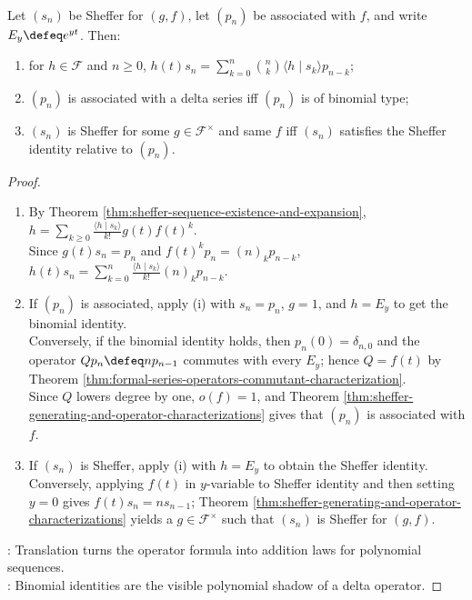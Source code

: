 \begin{theorem} \label{thm:sheffer-action-and-binomial-identities} \\
Let $(s_n)$ be Sheffer for $(g,f)$, let $(p_n)$ be associated with $f$, and
        write $E_y\defeq e^{yt}$. Then:
\begin{enumerate}[label=(\roman*)]
\setlength{\itemsep}{0pt}
\item for $h\in\mathscr{F}$ and $n\geq0$, $h(t)s_n=\sum\limits_{k=0}^{n}\binom{n}{k} \langle h\mid s_k\rangle p_{n-k}$;
\item $(p_n)$ is associated with a delta series iff $(p_n)$ is of binomial type;
\item $(s_n)$ is Sheffer for some $g\in\mathscr{F}^{\times}$ and same $f$ iff $(s_n)$ satisfies the Sheffer identity relative to $(p_n)$.
\end{enumerate}
\begin{proof}
\begin{enumerate}[label=(\roman*)]
\setlength{\itemsep}{0pt}
\item By Theorem \ref{thm:sheffer-sequence-existence-and-expansion}, $h=\sum\limits_{k\geq0}\frac{\langle h\mid s_k\rangle}{k!}g(t)f(t)^k$.\\
Since $g(t)s_n=p_n$ and $f(t)^kp_n=(n)_kp_{n-k}$, $h(t)s_n=\sum\limits_{k=0}^{n}\frac{\langle h\mid s_k\rangle}{k!}(n)_kp_{n-k}$.
\item If $(p_n)$ is associated, apply (i) with $s_n=p_n$, $g=1$, and $h=E_y$ to get the binomial identity.\\
Conversely, if the binomial identity holds, then $p_n(0)=\delta_{n,0}$ and the operator $Qp_n\defeq np_{n-1}$ commutes with every $E_y$; hence $Q=f(t)$ by Theorem \ref{thm:formal-series-operators-commutant-characterization}.\\
Since $Q$ lowers degree by one, $o(f)=1$, and Theorem \ref{thm:sheffer-generating-and-operator-characterizations} gives that $(p_n)$ is associated with $f$.
\item If $(s_n)$ is Sheffer, apply (i) with $h=E_y$ to obtain the Sheffer identity.\\
Conversely, applying $f(t)$ in $y$-variable to Sheffer identity and then setting $y=0$ gives $f(t)s_n=ns_{n-1}$; Theorem \ref{thm:sheffer-generating-and-operator-characterizations} yields a $g\in\mathscr{F}^{\times}$ such that $(s_n)$ is Sheffer for $(g,f)$.
\end{enumerate}
: Translation turns the operator formula into addition laws for polynomial sequences.\\
: Binomial identities are the visible polynomial shadow of a delta operator.
\end{proof}
\end{theorem}

